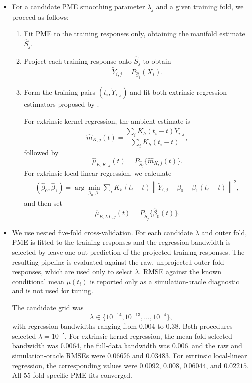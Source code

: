\begin{itemize}
    \item For a candidate PME smoothing parameter $\lambda_j$ and a given
    training fold, we proceed as follows:
    \begin{enumerate}
        \item Fit PME to the training responses only, obtaining the manifold
        estimate $\widehat S_{j}$.
        \item Project each training response onto $\widehat S_j$ to obtain
        \[
            \widetilde Y_{i,j}
            =P_{\widehat S_j}(X_i).
        \]
        \item Form the training pairs $(t_i,\widetilde Y_{i,j})$ and fit both
        extrinsic regression estimators proposed by
        \citet{linExtrinsicLocalRegression2017}.

        For extrinsic kernel regression, the ambient estimate is
        \[
            \widehat m_{K,j}(t)
            =\frac{\sum_iK_h(t_i-t)\widetilde Y_{i,j}}
            {\sum_iK_h(t_i-t)},
        \]
        followed by
        \[
            \widehat\mu_{E,K,j}(t)
            =P_{\widehat S_j}\{\widehat m_{K,j}(t)\}.
        \]
        For extrinsic local-linear regression, we calculate
        \begin{align}
            (\widehat\beta_0,\widehat\beta_1)
            =\arg\min_{\beta_0,\beta_1}
            \sum_i K_h(t_i-t)
            \left\|\widetilde Y_{i,j}
            -\beta_0-\beta_1(t_i-t)\right\|^2,
        \end{align}
        and then set
        \[
            \widehat\mu_{E,LL,j}(t)
            =P_{\widehat S_j}\{\widehat\beta_0(t)\}.
        \]
    \end{enumerate}

    \item We use nested five-fold cross-validation. For each candidate
    $\lambda$ and outer fold, PME is fitted to the training responses and the
    regression bandwidth is selected by leave-one-out prediction of the
    projected training responses. The resulting pipeline is evaluated against
    the raw, unprojected outer-fold responses, which are used only to select
    $\lambda$. RMSE against the known conditional mean $\mu(t_i)$ is reported
    only as a simulation-oracle diagnostic and is not used for tuning.

    The candidate grid was
    \[
        \lambda\in\{10^{-14},10^{-13},\ldots,10^{-4}\},
    \]
    with regression bandwidths ranging from $0.004$ to $0.38$. Both procedures
    selected $\lambda=10^{-8}$. For extrinsic kernel regression, the mean
    fold-selected bandwidth was $0.0064$, the full-data bandwidth was $0.006$,
    and the raw and simulation-oracle RMSEs were $0.06626$ and $0.03483$.
    For extrinsic local-linear regression, the corresponding values were
    $0.0092$, $0.008$, $0.06044$, and $0.02215$. All 55 fold-specific PME fits
    converged.
\end{itemize}

